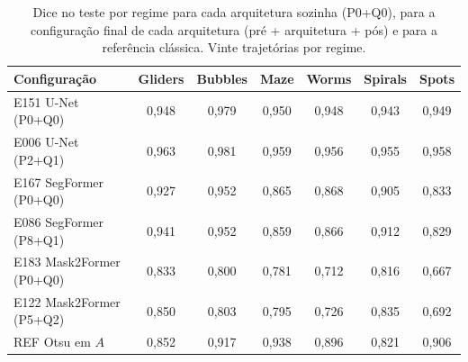 \begin{table}[htbp]
\centering
\caption{Dice no teste por regime para cada arquitetura sozinha (P0+Q0), para a configuração final de cada arquitetura (pré + arquitetura + pós) e para a referência clássica. Vinte trajetórias por regime.}
\label{tab:regime}
\footnotesize\setlength{\tabcolsep}{3pt}
\begin{sbcfitwidth}
\begin{tabular}{lcccccc}
\toprule
Configuração & Gliders & Bubbles & Maze & Worms & Spirals & Spots \\
\midrule
E151 U-Net (P0+Q0) & 0{,}948 & 0{,}979 & 0{,}950 & 0{,}948 & 0{,}943 & 0{,}949 \\
E006 U-Net (P2+Q1) & 0{,}963 & 0{,}981 & 0{,}959 & 0{,}956 & 0{,}955 & 0{,}958 \\
E167 SegFormer (P0+Q0) & 0{,}927 & 0{,}952 & 0{,}865 & 0{,}868 & 0{,}905 & 0{,}833 \\
E086 SegFormer (P8+Q1) & 0{,}941 & 0{,}952 & 0{,}859 & 0{,}866 & 0{,}912 & 0{,}829 \\
E183 Mask2Former (P0+Q0) & 0{,}833 & 0{,}800 & 0{,}781 & 0{,}712 & 0{,}816 & 0{,}667 \\
E122 Mask2Former (P5+Q2) & 0{,}850 & 0{,}803 & 0{,}795 & 0{,}726 & 0{,}835 & 0{,}692 \\
\midrule
REF Otsu em $A$ & 0{,}852 & 0{,}917 & 0{,}938 & 0{,}896 & 0{,}821 & 0{,}906 \\
\bottomrule
\end{tabular}
\end{sbcfitwidth}
\end{table}
